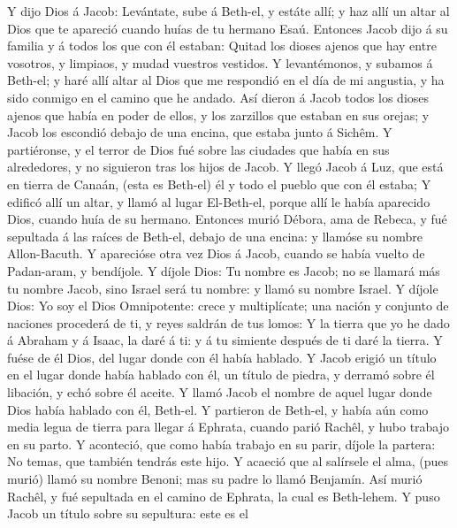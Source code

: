  Y dijo Dios á Jacob: Levántate, sube á Beth-el, y estáte
allí; y haz allí un altar al Dios que te apareció cuando huías de tu
hermano Esaú.  Entonces Jacob dijo á su familia y á todos
los que con él estaban: Quitad los dioses ajenos que hay entre vosotros,
y limpiaos, y mudad vuestros vestidos.  Y levantémonos, y
subamos á Beth-el; y haré allí altar al Dios que me respondió en el día
de mi angustia, y ha sido conmigo en el camino que he andado.
 Así dieron á Jacob todos los dioses ajenos que había en
poder de ellos, y los zarzillos que estaban en sus orejas; y Jacob los
escondió debajo de una encina, que estaba junto á Sichêm. 
Y partiéronse, y el terror de Dios fué sobre las ciudades que había en
sus alrededores, y no siguieron tras los hijos de Jacob. 
Y llegó Jacob á Luz, que está en tierra de Canaán, (esta es Beth-el) él
y todo el pueblo que con él estaba;  Y edificó allí un
altar, y llamó al lugar El-Beth-el, porque allí le había aparecido Dios,
cuando huía de su hermano.  Entonces murió Débora, ama de
Rebeca, y fué sepultada á las raíces de Beth-el, debajo de una encina: y
llamóse su nombre Allon-Bacuth.  Y aparecióse otra vez
Dios á Jacob, cuando se había vuelto de Padan-aram, y bendíjole.
 Y díjole Dios: Tu nombre es Jacob; no se llamará más tu
nombre Jacob, sino Israel será tu nombre: y llamó su nombre Israel.
 Y díjole Dios: Yo soy el Dios Omnipotente: crece y
multiplícate; una nación y conjunto de naciones procederá de ti, y reyes
saldrán de tus lomos:  Y la tierra que yo he dado á
Abraham y á Isaac, la daré á ti: y á tu simiente después de ti daré la
tierra.  Y fuése de él Dios, del lugar donde con él había
hablado.  Y Jacob erigió un título en el lugar donde
había hablado con él, un título de piedra, y derramó sobre él libación,
y echó sobre él aceite.  Y llamó Jacob el nombre de aquel
lugar donde Dios había hablado con él, Beth-el.  Y
partieron de Beth-el, y había aún como media legua de tierra para llegar
á Ephrata, cuando parió Rachêl, y hubo trabajo en su parto.
 Y aconteció, que como había trabajo en su parir, díjole
la partera: No temas, que también tendrás este hijo.  Y
acaeció que al salírsele el alma, (pues murió) llamó su nombre Benoni;
mas su padre lo llamó Benjamín.  Así murió Rachêl, y fué
sepultada en el camino de Ephrata, la cual es Beth-lehem.
 Y puso Jacob un título sobre su sepultura: este es el
